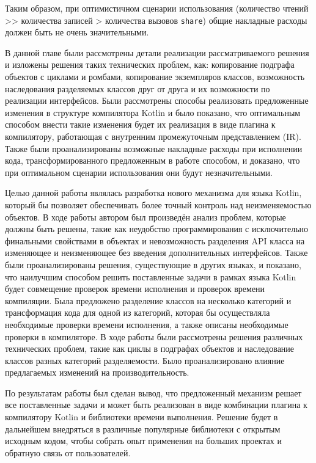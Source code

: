 \documentclass[specification,annotation,times]{itmo-student-thesis}
\begin{document}
Таким образом, при оптимистичном сценарии использования (количество чтений >{}> количества записей > количества вызовов \texttt{share})
общие накладные расходы должен быть не очень значительными.


\chapterconclusion

В данной главе были рассмотрены детали реализации рассматриваемого решения и изложены решения таких технических проблем, как: копирование подграфа объектов с циклами и ромбами, копирование экземпляров классов, возможность наследования разделяемых классов друг от друга и их возможности по реализации интерфейсов.
Были рассмотрены способы реализовать предложенные изменения в структуре компилятора Kotlin и было показано, что оптимальным способом внести такие изменения будет их реализация в виде плагина к компилятору, работающая с внутренним промежуточным представлением (IR).
Также были проанализированы возможные накладные расходы при исполнении кода, трансформированного предложенным в работе способом, и доказано, что при оптимальном сценарии использования они будут незначительными.


\startconclusionpage

Целью данной работы являлась разработка нового механизма для языка Kotlin, который бы позволяет обеспечивать более точный контроль над неизменяемостью объектов.
В ходе работы автором был произведён анализ проблем, которые должны быть решены, такие как неудобство программирования с исключительно финальными свойствами в объектах и невозможность разделения API класса на изменяющее и неизменяющее без введения дополнительных интерфейсов.
Также были проанализированы решения, существующие в других языках, и показано, что наилучшим способом решить поставленные задачи в рамках языка Kotlin будет совмещение проверок времени исполнения и проверок времени компиляции.
Была предложено разделение классов на несколько категорий и трансформация кода для одной из категорий, которая бы осуществляла необходимые проверки времени исполнения, а также описаны необходимые проверки в компиляторе.
В ходе работы были рассмотрены решения различных технических проблем, такие как циклы в подграфах объектов и наследование классов разных категорий разделяемости. Было проанализировано влияние предлагаемых изменений на производительность.

По результатам работы был сделан вывод, что предложенный механизм решает все поставленные задачи и может быть реализован в виде комбинации плагина к компилятору Kotlin и библиотеки времени выполнения.
Решение будет в дальнейшем внедряться в различные популярные библиотеки с открытым исходным кодом, чтобы собрать опыт применения на больших проектах и обратную связь от пользователей.
\end{document}
